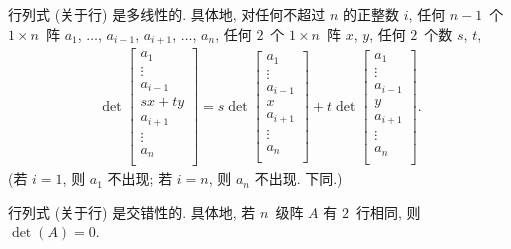 \documentclass[../libro.tex]{subfiles}
\begin{document}
\begin{theorem}[多线性]
    行列式 (关于行) 是多线性的.
    具体地, 对任何不超过 \(n\) 的正整数 \(i\),
    任何 \(n-1\)~个 \(1 \times n\)~阵
    \(a_1\), \(\dots\), \(a_{i-1}\),
    \(a_{i+1}\), \(\dots\), \(a_n\),
    任何 \(2\)~个 \(1 \times n\)~阵 \(x\), \(y\),
    任何 \(2\)~个数 \(s\), \(t\),
    \begin{align*}
        \det
        {
            \begin{bmatrix}
                a_1     \\
                \vdots  \\
                a_{i-1} \\
                sx + ty \\
                a_{i+1} \\
                \vdots  \\
                a_{n}   \\
        \end{bmatrix}}
        =
        s \det
        {
            \begin{bmatrix}
                a_1     \\
                \vdots  \\
                a_{i-1} \\
                x       \\
                a_{i+1} \\
                \vdots  \\
                a_{n}   \\
        \end{bmatrix}}
        +
        t \det
        {
            \begin{bmatrix}
                a_1     \\
                \vdots  \\
                a_{i-1} \\
                y       \\
                a_{i+1} \\
                \vdots  \\
                a_{n}   \\
        \end{bmatrix}}.
    \end{align*}
    (若 \(i = 1\), 则 \(a_1\) 不出现; %
    若 \(i = n\), 则 \(a_n\) 不出现.
    下同.) %
\end{theorem}

\begin{theorem}[交错性]
    行列式 (关于行) 是交错性的.
    具体地,
    若 \(n\)~级阵 \(A\) 有 \(2\)~行相同,
    则 \(\det {(A)} = 0\).
\end{theorem}
\end{document}

